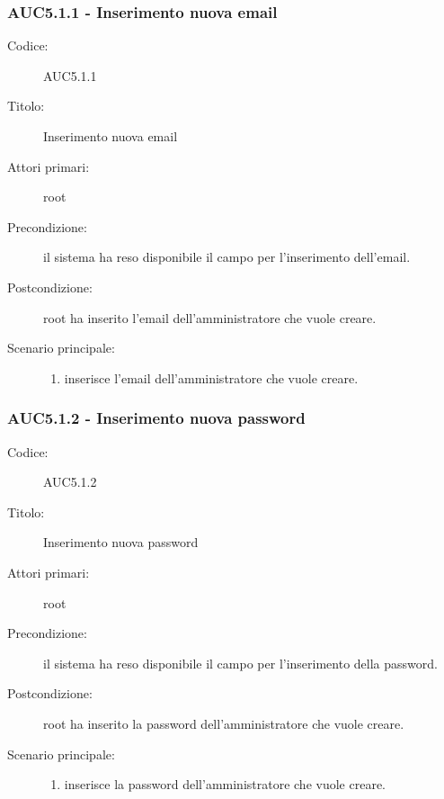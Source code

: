 \documentclass[casi-duso]{subfiles}
\begin{document}
\subsubsection{AUC5.1.1 - Inserimento nuova email}%
\label{subsub:AUC5.1.1}
\begin{description}
  \item[Codice:] AUC5.1.1
  \item[Titolo:] Inserimento nuova email
  \item[Attori primari:] root
  \item[Precondizione:] il sistema ha reso disponibile il campo per l'inserimento dell'email.
  \item[Postcondizione:] root ha inserito l'email dell'amministratore che vuole creare.
  \item[Scenario principale:]
  \begin{enumerate}
    \item {} inserisce l'email dell'amministratore che vuole creare.
  \end{enumerate}
\end{description}

\subsubsection{AUC5.1.2 - Inserimento nuova password}%
\label{subsub:AUC5.1.2}
\begin{description}
  \item[Codice:] AUC5.1.2
  \item[Titolo:] Inserimento nuova password
  \item[Attori primari:] root
  \item[Precondizione:] il sistema ha reso disponibile il campo per l'inserimento della password.
  \item[Postcondizione:] root ha inserito la password dell'amministratore che vuole creare.
  \item[Scenario principale:]
  \begin{enumerate}
    \item {} inserisce la password dell'amministratore che vuole creare.
  \end{enumerate}
\end{description}
\end{document}
